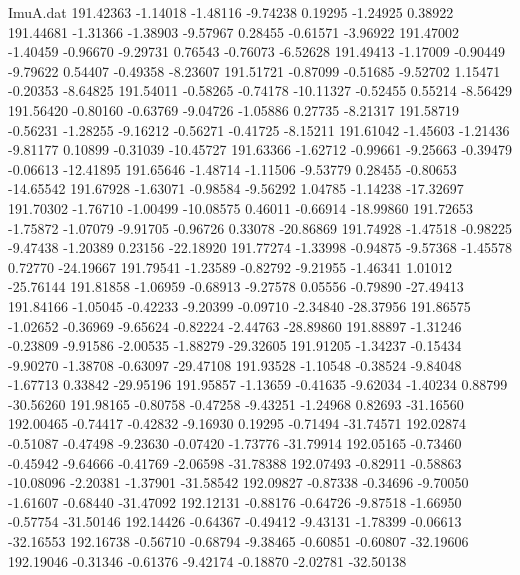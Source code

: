 \begin{filecontents}{ImuA.dat}
 191.42363   -1.14018   -1.48116   -9.74238    0.19295   -1.24925    0.38922
 191.44681   -1.31366   -1.38903   -9.57967    0.28455   -0.61571   -3.96922
 191.47002   -1.40459   -0.96670   -9.29731    0.76543   -0.76073   -6.52628
 191.49413   -1.17009   -0.90449   -9.79622    0.54407   -0.49358   -8.23607
 191.51721   -0.87099   -0.51685   -9.52702    1.15471   -0.20353   -8.64825
 191.54011   -0.58265   -0.74178  -10.11327   -0.52455    0.55214   -8.56429
 191.56420   -0.80160   -0.63769   -9.04726   -1.05886    0.27735   -8.21317
 191.58719   -0.56231   -1.28255   -9.16212   -0.56271   -0.41725   -8.15211
 191.61042   -1.45603   -1.21436   -9.81177    0.10899   -0.31039  -10.45727
 191.63366   -1.62712   -0.99661   -9.25663   -0.39479   -0.06613  -12.41895
 191.65646   -1.48714   -1.11506   -9.53779    0.28455   -0.80653  -14.65542
 191.67928   -1.63071   -0.98584   -9.56292    1.04785   -1.14238  -17.32697
 191.70302   -1.76710   -1.00499  -10.08575    0.46011   -0.66914  -18.99860
 191.72653   -1.75872   -1.07079   -9.91705   -0.96726    0.33078  -20.86869
 191.74928   -1.47518   -0.98225   -9.47438   -1.20389    0.23156  -22.18920
 191.77274   -1.33998   -0.94875   -9.57368   -1.45578    0.72770  -24.19667
 191.79541   -1.23589   -0.82792   -9.21955   -1.46341    1.01012  -25.76144
 191.81858   -1.06959   -0.68913   -9.27578    0.05556   -0.79890  -27.49413
 191.84166   -1.05045   -0.42233   -9.20399   -0.09710   -2.34840  -28.37956
 191.86575   -1.02652   -0.36969   -9.65624   -0.82224   -2.44763  -28.89860
 191.88897   -1.31246   -0.23809   -9.91586   -2.00535   -1.88279  -29.32605
 191.91205   -1.34237   -0.15434   -9.90270   -1.38708   -0.63097  -29.47108
 191.93528   -1.10548   -0.38524   -9.84048   -1.67713    0.33842  -29.95196
 191.95857   -1.13659   -0.41635   -9.62034   -1.40234    0.88799  -30.56260
 191.98165   -0.80758   -0.47258   -9.43251   -1.24968    0.82693  -31.16560
 192.00465   -0.74417   -0.42832   -9.16930    0.19295   -0.71494  -31.74571
 192.02874   -0.51087   -0.47498   -9.23630   -0.07420   -1.73776  -31.79914
 192.05165   -0.73460   -0.45942   -9.64666   -0.41769   -2.06598  -31.78388
 192.07493   -0.82911   -0.58863  -10.08096   -2.20381   -1.37901  -31.58542
 192.09827   -0.87338   -0.34696   -9.70050   -1.61607   -0.68440  -31.47092
 192.12131   -0.88176   -0.64726   -9.87518   -1.66950   -0.57754  -31.50146
 192.14426   -0.64367   -0.49412   -9.43131   -1.78399   -0.06613  -32.16553
 192.16738   -0.56710   -0.68794   -9.38465   -0.60851   -0.60807  -32.19606
 192.19046   -0.31346   -0.61376   -9.42174   -0.18870   -2.02781  -32.50138

\end{filecontents}

